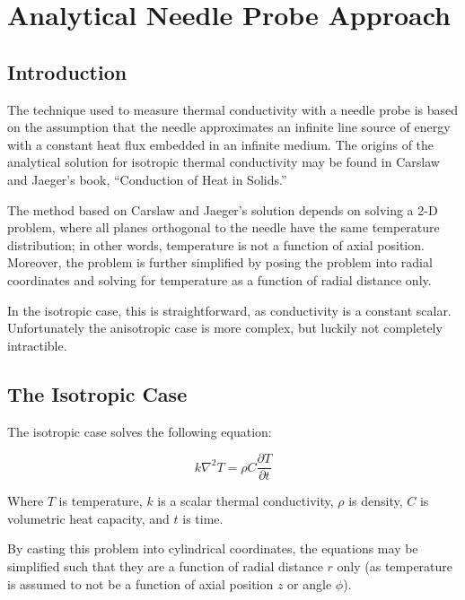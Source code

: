 \chapter{Analytical Needle Probe Approach}
\label{sec:analytical-np}
\bigskip

\section{Introduction}

The technique used to measure thermal conductivity with a needle probe is based
on the assumption that the needle approximates an infinite line source of energy
with a constant heat flux embedded in an infinite medium. The origins of the
analytical solution for isotropic thermal conductivity may be found in Carslaw
and Jaeger's book, ``Conduction of Heat in Solids.'' \cite{basictheory}

The method based on Carslaw and Jaeger's solution depends on solving a 2-D
problem, where all planes orthogonal to the needle have the same temperature
distribution; in other words, temperature is not a function of axial position.
Moreover, the problem is further simplified by posing the problem into radial
coordinates and solving for temperature as a function of radial distance only.

In the isotropic case, this is straightforward, as conductivity is a constant
scalar. Unfortunately the anisotropic case is more complex, but luckily not
completely intractible.

\section{The Isotropic Case}

The isotropic case solves the following equation:

\begin{equation*}
k\nabla^2 T = \rho C\frac{\partial T}{\partial t}
\end{equation*}

Where \(T\) is temperature, \(k\) is a scalar thermal conductivity, \(\rho\) is
density, \(C\) is volumetric heat capacity, and \(t\) is time.


By casting this problem into cylindrical coordinates, the equations may be
simplified such that they are a function of radial distance \(r\) only (as
temperature is assumed to not be a function of axial position \(z\) or angle
\(\phi\)).

